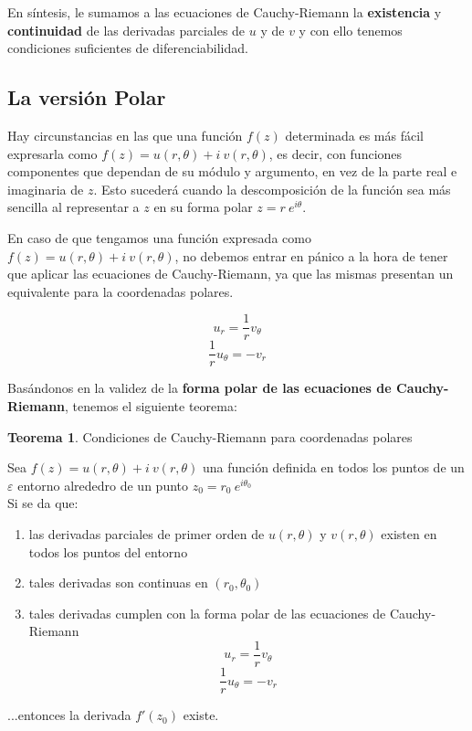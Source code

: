 \documentclass[12pt]{article}
\theoremstyle{definition}
\theoremstyle{theorem}
\newtheorem{theorem}{Teorema}[section]
\theoremstyle{corolary}
\begin{document}
En s\'intesis, le sumamos a las ecuaciones de Cauchy-Riemann la \textbf{existencia} y \textbf{continuidad} de las derivadas parciales de $u$ y de $v$ y con ello tenemos condiciones suficientes de diferenciabilidad.\\


	\subsection{La versi\'on Polar}
	Hay circunstancias en las que una funci\'on $f(z)$ determinada es m\'as f\'acil expresarla como $f(z)=u(r, \theta) + i\ v(r, \theta)$, es decir, con funciones componentes que dependan de su m\'odulo y argumento, en vez de la parte real e imaginaria de $z$. Esto suceder\'a cuando la descomposici\'on de la funci\'on sea m\'as sencilla al representar a $z$ en su forma polar $z= r\ e^{i\theta}$.
	
	En caso de que tengamos una funci\'on expresada como $f(z)=u(r, \theta) + i\ v(r, \theta)$, no debemos entrar en p\'anico a la hora de tener que aplicar las ecuaciones de Cauchy-Riemann, ya que las mismas presentan un equivalente para la coordenadas polares.
	
	$$u_r = \frac{1}{r}v_{\theta}$$
	$$\frac{1}{r}u_{\theta} = -v_r$$
	
Bas\'andonos en la validez de la \textbf{forma polar de las ecuaciones de Cauchy-Riemann}, tenemos el siguiente teorema:\\

\colorbox{green!40!white!80}{\parbox{\linewidth}{
\theoremstyle{theorem}
\begin{theorem} {Condiciones de Cauchy-Riemann para coordenadas polares}

Sea $f(z) = u(r, \theta) + i\  v(r, \theta)$ una funci\'on definida en todos los puntos de un $\varepsilon$ entorno alrededro de un punto $z_0 = r_0\ e^{i\theta_0}$\\

Si se da que:
\begin{enumerate}
	\item las derivadas parciales de primer orden de $u(r, \theta)$ y $v(r, \theta)$ existen en todos los puntos del entorno
	\item tales derivadas son continuas en $(r_0, \theta_0)$
	\item tales derivadas cumplen con la forma polar de las ecuaciones de Cauchy-Riemann
	 $$u_r = \frac{1}{r}v_{\theta}$$ $$\frac{1}{r}u_{\theta} = -v_r$$
\end{enumerate}
...entonces la derivada $f'(z_0)$ existe.
\end{theorem}}}
\linebreak
\end{document}
